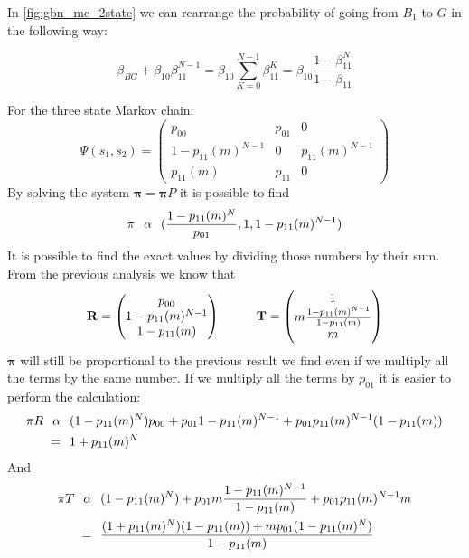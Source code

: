 In \autoref{fig:gbn_mc_2state} we can rearrange the probability of going from $B_1$ to $G$ in the following way:

\begin{equation}
	\beta_{BG} + \beta_{10}\beta_{11}^{N-1} = \beta_{10}\sum_{K=0}^{N-1} \beta_{11}^K = \beta_{10}\frac{1-\beta_{11}^N}{1-\beta_{11}}
\end{equation}

For the three state Markov chain:
$$\Psi(s_1,s_2)=
\begin{pmatrix}
		p_{00} & p_{01} & 0 \\
		1-p_{11}(m)^{N-1} & 0 & p_{11}(m)^{N-1} \\
		p_{11}(m) & p_{11} & 0
\end{pmatrix} $$
By solving the system $\mathbf{\pi} = \mathbf{\pi}P$ it is possible to find
$$\mathbf{\pi} \hspace{0.25 cm} \alpha \hspace{0.25cm} (\frac{1-p_{11}(m)^{N}}{p_{01}},1,1-p_{11}(m)^{N-1})$$
It is  possible to find the exact values by dividing those numbers by their sum. From the previous analysis we know that
$$\mathbf{R} =
\begin{pmatrix}
		p_{00}\\
	  1-p_{11}(m)^{N-1} \\
		1-p_{11}(m)
\end{pmatrix} \hspace{1 cm}
\mathbf{T} =
\begin{pmatrix}
		1 \\
		m \frac{1-p_{11}(m)^{N-1}}{1-p_{11}(m)} \\
		m
\end{pmatrix} $$
$\mathbf{\pi}$ will still be proportional to the previous result we find even if we multiply all the  terms by the same number. If we multiply all the terms by $p_{01}$ it is easier to perform the calculation:
\begin{equation}
	\begin{split}
		\mathbf{\pi}R \hspace{0.25 cm} \alpha &  \hspace{0.25cm}  (1-p_{11}(m)^{N})p_{00} + p_{01}1-p_{11}(m)^{N-1} + p_{01}p_{11}(m)^{N-1}(1-p_{11}(m))\\
		= & \hspace{0.25cm} 1 + p_{11}(m)^N
	\end{split}
\end{equation}
And
\begin{equation}
	\begin{split}
		\mathbf{\pi}T \hspace{0.25 cm} \alpha &  \hspace{0.25cm}  (1-p_{11}(m)^{N}) + p_{01}m\frac{1-p_{11}(m)^{N-1}}{1-p_{11}(m)} + p_{01}p_{11}(m)^{N-1}m\\
		= & \hspace{0.25cm} \frac{(1 + p_{11}(m)^N)(1-p_{11}(m))+mp_{01}(1-p_{11}(m)^N)}{1-p_{11}(m)}
	\end{split}
\end{equation}
